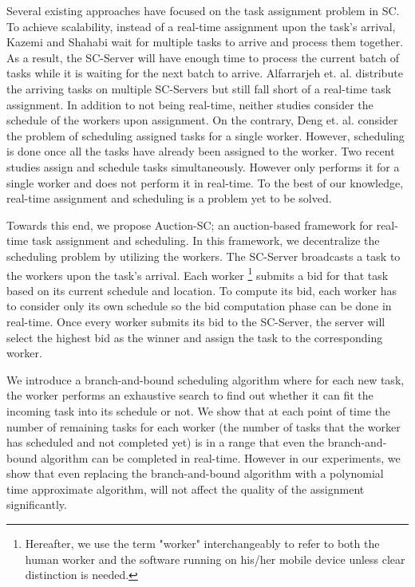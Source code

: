 Several existing approaches \cite{Kazemi12,Deng13,Cheng15,Li15,Alfarrarjeh15} have focused on the task assignment problem in SC.  To achieve scalability, instead of a real-time assignment upon the task's arrival, Kazemi and Shahabi \cite{Kazemi12} wait for multiple tasks to arrive and process them together. As a result, the SC-Server will have enough time to process the current batch of tasks while it is waiting for the next batch to arrive. Alfarrarjeh et. al. \cite{Alfarrarjeh15} distribute the arriving tasks on multiple SC-Servers but still fall short of a real-time task assignment. In addition to not being real-time, neither studies consider the schedule of the workers upon assignment. On the contrary, Deng et. al. \cite{Deng13} consider the problem of scheduling assigned tasks for a single worker. However, scheduling is done once all the tasks have already been assigned to the worker. Two recent studies \cite{Li15,Deng15} assign and schedule tasks simultaneously. However \cite{Li15} only performs it for a single worker and \cite{Deng15} does not perform it in real-time. To the best of our knowledge, real-time assignment and scheduling is a problem yet to be solved.

Towards this end, we propose Auction-SC; an auction-based framework for real-time task assignment and scheduling. In this framework, we decentralize the scheduling problem by utilizing the workers. The SC-Server broadcasts a task to the workers upon the task's arrival. Each worker \footnote{Hereafter, we use the term "worker" interchangeably to refer to both the human worker and the software running on his/her mobile device unless clear distinction is needed.} submits a bid for that task based on its current schedule and location. To compute its bid, each worker has to consider only its own schedule so the bid computation phase can be done in real-time. Once every worker submits its bid to the SC-Server, the server will select the highest bid as the winner and assign the task to the corresponding worker.

We introduce a branch-and-bound scheduling algorithm where for each new task, the worker performs an exhaustive search to find out whether it can fit the incoming task into its schedule or not. We show that at each point of time the number of remaining tasks for each worker (the number of tasks that the worker has scheduled and not completed yet) is in a range that even the branch-and-bound algorithm can be completed in real-time. However in our experiments, we show that even replacing the branch-and-bound algorithm with a polynomial time approximate algorithm, will not affect the quality of the assignment significantly.

